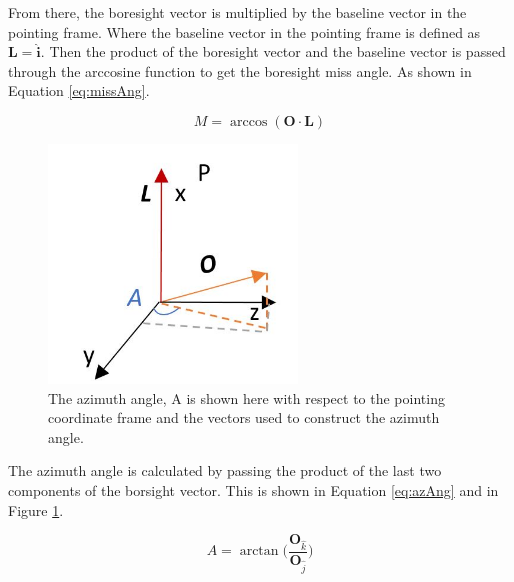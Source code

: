 From there, the boresight vector is multiplied by the baseline vector in the pointing frame. Where the baseline vector in the pointing frame is defined as $\bm L = \hat{\bm i}$. Then the product of the boresight vector and the baseline vector is passed through the arccosine function to get the boresight miss angle. As shown in Equation \ref{eq:missAng}.

 \begin{equation}
 	\label{eq:missAng}
 	M = \arccos(\bm O \cdot \bm L)
\end{equation}

\begin{figure}[H]
	\centerline{
		 \includegraphics[height = 2.5in]{Figures/azi.JPG}
	}
	\caption{The azimuth angle, A is shown here with respect to the pointing coordinate frame and the vectors used to construct the azimuth angle.}
	\label{fig:Fig2}
\end{figure}
 
The azimuth angle is calculated by passing the product of the last two components of the borsight vector. This is shown in Equation \ref{eq:azAng} and in Figure \ref{fig:Fig2}.

 \begin{equation}
 	\label{eq:azAng}
 	A = \arctan\bigg(\frac{\bm O_{\hat k}}{\bm O_{\hat j}}\bigg)
\end{equation}